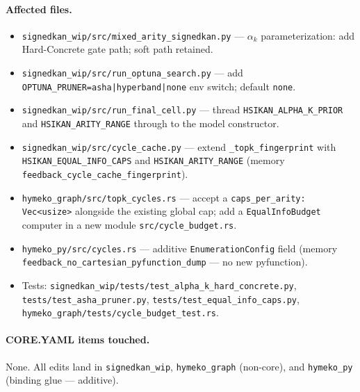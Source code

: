 \documentclass{article}
\begin{document}
\paragraph{Affected files.}
\begin{itemize}
  \item \texttt{signedkan\_wip/src/mixed\_arity\_signedkan.py} ---
  $\alpha_k$ parameterization: add Hard-Concrete gate path; soft path retained.
  \item \texttt{signedkan\_wip/src/run\_optuna\_search.py} --- add
  \texttt{OPTUNA\_PRUNER=asha|hyperband|none} env switch; default
  \texttt{none}.
  \item \texttt{signedkan\_wip/src/run\_final\_cell.py} --- thread
  \texttt{HSIKAN\_ALPHA\_K\_PRIOR} and \texttt{HSIKAN\_ARITY\_RANGE}
  through to the model constructor.
  \item \texttt{signedkan\_wip/src/cycle\_cache.py} --- extend
  \texttt{\_topk\_fingerprint} with \texttt{HSIKAN\_EQUAL\_INFO\_CAPS}
  and \texttt{HSIKAN\_ARITY\_RANGE}
  (memory \texttt{feedback\_cycle\_cache\_fingerprint}).
  \item \texttt{hymeko\_graph/src/topk\_cycles.rs} --- accept a
  \texttt{caps\_per\_arity: Vec<usize>} alongside the existing global
  cap; add a \texttt{EqualInfoBudget} computer in a new module
  \texttt{src/cycle\_budget.rs}.
  \item \texttt{hymeko\_py/src/cycles.rs} --- additive
  \texttt{EnumerationConfig} field
  (memory \texttt{feedback\_no\_cartesian\_pyfunction\_dump} --- no new
  pyfunction).
  \item Tests: \texttt{signedkan\_wip/tests/test\_alpha\_k\_hard\_concrete.py},
  \texttt{tests/test\_asha\_pruner.py},
  \texttt{tests/test\_equal\_info\_caps.py},
  \texttt{hymeko\_graph/tests/cycle\_budget\_test.rs}.
\end{itemize}

\paragraph{CORE.YAML items touched.} None.  All edits land in
\texttt{signedkan\_wip}, \texttt{hymeko\_graph} (non-core), and
\texttt{hymeko\_py} (binding glue --- additive).
\end{document}
